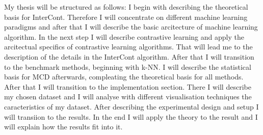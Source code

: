 My thesis will be structured as follows:
I begin with describing the theoretical basis for InterCont. 
Therefore I will concentrate on different machine learning paradigms and after that I will describe the basic arcitecture of machine learning algorithm.
In the next step I will describe contrastive learning and apply the arcitectual specifics of contrastive learning algorithms.
That will lead me to the description of the details in the InterCont algorithm.
After that I will transition to the benchmark methods, beginning with k-NN.
I will describe the statistical basis for MCD afterwards, compleating the theoretical basis for all methods.
After that I will transition to the implementation section.
There I will describe my chosen dataset and I will analyse with different visualisation techniques the caracteristics of my dataset.
After describing the experimental design and setup I will transiion to the results.
In the end I will apply the theory to the result and I will explain how the results fit into it. 
 